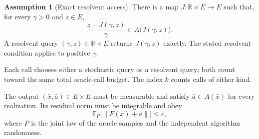 \documentclass[10pt]{article}
\theoremstyle{definition}
\newtheorem{assumption}{Assumption}
\begin{document}
\begin{assumption}[Exact resolvent access]
There is a map $J:\mathbb{R}\times E\to E$ such that, for every $\gamma>0$ and $z\in E$,
\[
\frac{z-J(\gamma,z)}{\gamma}\in A\bigl(J(\gamma,z)\bigr).
\]
A resolvent query $(\gamma,z)\in\mathbb{R}\times E$ returns $J(\gamma,z)$ exactly. The stated resolvent condition applies to positive $\gamma$.
\end{assumption}

Each call chooses either a stochastic query or a resolvent query; both count toward the same total oracle-call budget. The index $k$ counts calls of either kind.

The output $(\bar{x},\bar{a})\in E\times E$ must be measurable and satisfy $\bar{a}\in A(\bar{x})$ for every realization. Its residual norm must be integrable and obey
\[
\mathbb{E}_{P}\bigl[\|F(\bar{x})+\bar{a}\|\bigr]\leq\varepsilon,
\]
where $P$ is the joint law of the oracle samples and the independent algorithm randomness.
\end{document}
